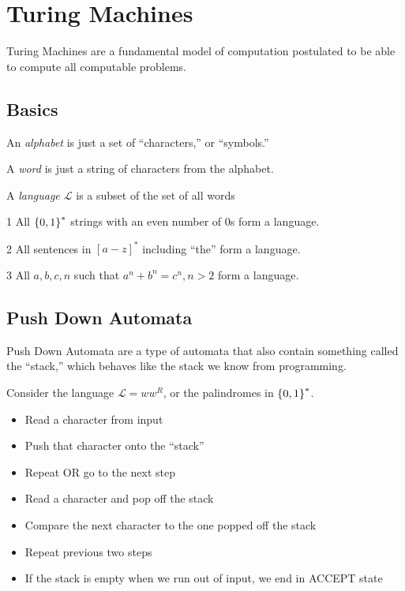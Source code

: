 \section{Turing Machines}
Turing Machines are a fundamental model of computation postulated to be
able to compute all computable problems.

\subsection{Basics}
\begin{definition}
    An \emph{alphabet} is just a set of ``characters,'' or ``symbols.''
\end{definition}
\begin{definition}
    A \emph{word} is just a string of characters from the alphabet.
\end{definition}
\begin{definition}
    A \emph{language $\mathcal L$} is a subset of the set of all words
\end{definition}
\begin{example}1
    All $\left\{0, 1\right\}^*$ strings with an even number of 0s form a language.
\end{example}
\begin{example}2
    All sentences in $[a - z]^*$ including ``the'' form a language.
\end{example}
\begin{example}3
    All $a, b, c, n$ such that $a^n + b^n = c^n, n > 2$ form a language.
\end{example}

\subsection{Push Down Automata}
Push Down Automata are a type of automata that also contain something
called the ``stack,'' which behaves like the stack we know from programming.

Consider the language $\mathcal L = ww^R$, or the palindromes in $\left\{0, 1\right\}^*$.
\begin{itemize}
    \item Read a character from input
    \item Push that character onto the ``stack''
    \item Repeat OR go to the next step
    \item Read a character and pop off the stack
    \item Compare the next character to the one popped off the stack
    \item Repeat previous two steps
    \item If the stack is empty when we run out of input, we end in ACCEPT
    state
\end{itemize}

